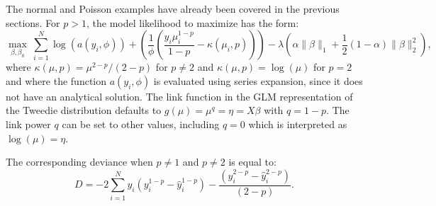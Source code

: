 \newpage
\waterExampleInR


\medskip
\waterExampleInPython


The normal and Poisson examples have already been covered in the previous sections. For $p>1$, the model likelihood to maximize has the form: 
$$  \max_{\beta,\beta_0} \ \sum_{i=1}^N \log(a(y_i,\phi)) + \left( \frac{1}{\phi}\left( \frac{y_i\mu_i^{1-p}}{1-p} - \kappa(\mu_i,p) \right)  \right) -\lambda  \left(  \alpha \| \beta \|_1 + \frac{1}{2}(1-\alpha)\| \beta \|_2^2  \right), $$
where $\kappa(\mu,p) = \mu^{2-p}/(2-p)$ for $p \neq 2$ and $\kappa(\mu,p) = \log(\mu)$ for $p=2$ and where the function $a(y_i,\phi)$ is evaluated using series expansion, since it does not have an analytical solution. The link function in the GLM representation of the Tweedie distribution defaults to $g(\mu) = \mu^{q} = \eta = X\beta$ with $q=1-p$. The link power $q$ can be set to other values, including $q=0$ which is interpreted as $\log(\mu)=\eta$. 
%

The corresponding deviance when $p \neq 1$ and $p\neq 2$ is equal to:
$$D = -2 \sum_{i=1}^{N} y_i  (y_i^{1-p} - \hat{y}_i^{1-p} ) - \frac{(y_i^{2 - p} - \hat{y}_i^{2 - p})}{(2 - p)}. $$\\

%


